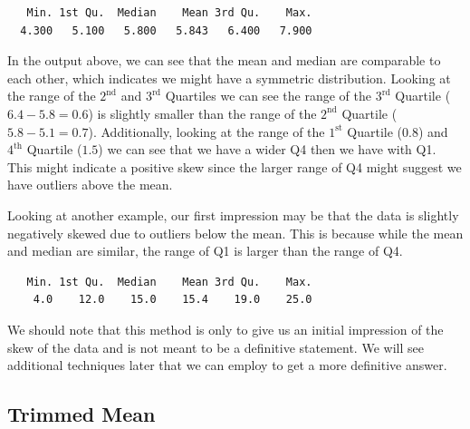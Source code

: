 \documentclass[
  letterpaper,
  DIV=11,
  numbers=noendperiod]{scrreprt}
\newenvironment{Shaded}{\begin{snugshade}}{\end{snugshade}}
\newcommand{\FunctionTok}[1]{\textcolor[rgb]{0.28,0.35,0.67}{#1}}
\newcommand{\NormalTok}[1]{\textcolor[rgb]{0.00,0.23,0.31}{#1}}
\newcommand{\SpecialCharTok}[1]{\textcolor[rgb]{0.37,0.37,0.37}{#1}}
\begin{document}
\begin{Shaded}
\end{Shaded}

\begin{verbatim}
   Min. 1st Qu.  Median    Mean 3rd Qu.    Max. 
  4.300   5.100   5.800   5.843   6.400   7.900 
\end{verbatim}

In the output above, we can see that the mean and median are comparable
to each other, which indicates we might have a symmetric distribution.
Looking at the range of the \(2^{\text{nd}}\) and \(3^{\text{rd}}\)
Quartiles we can see the range of the \(3^{\text{rd}}\) Quartile
(\(6.4-5.8=0.6\)) is slightly smaller than the range of the
\(2^{\text{nd}}\) Quartile (\(5.8-5.1=0.7\)). Additionally, looking at
the range of the \(1^{\text{st}}\) Quartile (\(0.8\)) and
\(4^{\text{th}}\) Quartile (\(1.5\)) we can see that we have a wider Q4
then we have with Q1. This might indicate a positive skew since the
larger range of Q4 might suggest we have outliers above the mean.

Looking at another example, our first impression may be that the data is
slightly negatively skewed due to outliers below the mean. This is
because while the mean and median are similar, the range of Q1 is larger
than the range of Q4.

\begin{Shaded}
\end{Shaded}

\begin{verbatim}
   Min. 1st Qu.  Median    Mean 3rd Qu.    Max. 
    4.0    12.0    15.0    15.4    19.0    25.0 
\end{verbatim}

We should note that this method is only to give us an initial impression
of the skew of the data and is not meant to be a definitive statement.
We will see additional techniques later that we can employ to get a more
definitive answer.

\subsection{Trimmed Mean}\label{trimmed-mean}
\end{document}
